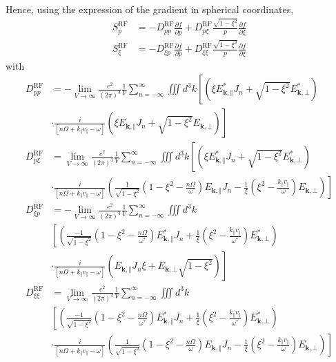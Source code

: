 Hence, using the expression of the gradient in spherical coordinates,
\begin{align}
S_{p}^{\text{RF}}  &  =-D_{pp}^{\text{RF}}\frac{\partial f}{\partial
p}+D_{p\xi}^{\text{RF}}\frac{\sqrt{1-\xi^{2}}}{p}\frac{\partial f}{\partial
\xi}\\
S_{\xi}^{\text{RF}}  &  =-D_{\xi p}^{\text{RF}}\frac{\partial f}{\partial
p}+D_{\xi\xi}^{\text{RF}}\frac{\sqrt{1-\xi^{2}}}{p}\frac{\partial f}%
{\partial\xi}%
\end{align}
with
\begin{align}
D_{pp}^{\text{RF}}  &  =-\lim_{V\rightarrow\infty}\frac{e^{2}}{\left(
2\pi\right)  ^{3}}\frac{1}{V}\sum_{n=-\infty}^{\infty}\iiint d^{3}k\left[
\left(  \xi E_{\mathbf{k},\Vert}^{\ast}J_{n}+\sqrt{1-\xi^{2}}E_{\mathbf{k}%
,\bot}^{\ast}\right)  \right. \nonumber\\
&  \left.  \cdot\frac{i}{\left[  n\Omega+k_{\Vert}v_{\Vert}-\omega\right]
}\left(  \xi E_{\mathbf{k},\Vert}J_{n}+\sqrt{1-\xi^{2}}E_{\mathbf{k},\bot
}\right)  \right] \\
D_{p\xi}^{\text{RF}}  &  =\lim_{V\rightarrow\infty}\frac{e^{2}}{\left(
2\pi\right)  ^{3}}\frac{1}{V}\sum_{n=-\infty}^{\infty}\iiint d^{3}k\left[
\left(  \xi E_{\mathbf{k},\Vert}^{\ast}J_{n}+\sqrt{1-\xi^{2}}E_{\mathbf{k}%
,\bot}^{\ast}\right)  \right. \nonumber\\
&  \left.  \cdot\frac{i}{\left[  n\Omega+k_{\Vert}v_{\Vert}-\omega\right]
}\left(  \frac{1}{\sqrt{1-\xi^{2}}}\left(  1-\xi^{2}-\frac{n\Omega}{\omega
}\right)  E_{\mathbf{k},\Vert}J_{n}-\frac{1}{\xi}\left(  \xi^{2}%
-\frac{k_{\Vert}v_{\Vert}}{\omega}\right)  E_{\mathbf{k},\bot}\right)  \right]
\\
D_{\xi p}^{\text{RF}}  &
=-\lim_{V\rightarrow\infty}\frac{e^{2}}{\left( 2\pi\right)
^{3}}\frac{1}{V}\sum_{n=-\infty}^{\infty}\iiint
d^{3}k\nonumber\\&\left[
\left(  \frac{-1}{\sqrt{1-\xi^{2}}}\left(  1-\xi^{2}-\frac{n\Omega}%
{\omega^{\ast}}\right)  E_{\mathbf{k},\Vert}^{\ast}J_{n}+\frac{1}{\xi}\left(
\xi^{2}-\frac{k_{\Vert}v_{\Vert}}{\omega^{\ast}}\right)  E_{\mathbf{k},\bot
}^{\ast}\right)  \right. \nonumber\\
&  \left.  \cdot\frac{i}{\left[  n\Omega+k_{\Vert}v_{\Vert}-\omega\right]
}\left(  E_{\mathbf{k},\Vert}J_{n}\xi+E_{\mathbf{k},\bot}\sqrt{1-\xi^{2}%
}\right)  \right] \\
D_{\xi\xi}^{\text{RF}}  &
=\lim_{V\rightarrow\infty}\frac{e^{2}}{\left( 2\pi\right)
^{3}}\frac{1}{V}\sum_{n=-\infty}^{\infty}\iiint
d^{3}k\nonumber\\&\left[
\left(  \frac{-1}{\sqrt{1-\xi^{2}}}\left(  1-\xi^{2}-\frac{n\Omega}%
{\omega^{\ast}}\right)  E_{\mathbf{k},\Vert}^{\ast}J_{n}+\frac{1}{\xi}\left(
\xi^{2}-\frac{k_{\Vert}v_{\Vert}}{\omega^{\ast}}\right)  E_{\mathbf{k},\bot
}^{\ast}\right)  \right. \nonumber\\
&  \left.  \cdot\frac{i}{\left[  n\Omega+k_{\Vert}v_{\Vert}-\omega\right]
}\left(  \frac{1}{\sqrt{1-\xi^{2}}}\left(  1-\xi^{2}-\frac{n\Omega}{\omega
}\right)  E_{\mathbf{k},\Vert}J_{n}-\frac{1}{\xi}\left(  \xi^{2}%
-\frac{k_{\Vert}v_{\Vert}}{\omega}\right)  E_{\mathbf{k},\bot}\right)
\right]
\end{align}

